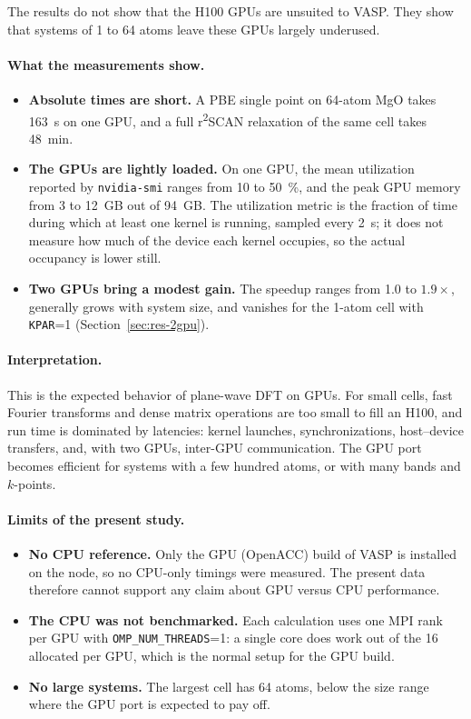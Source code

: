 \documentclass[11pt,letterpaper]{article}
\begin{document}
The results do not show that the H100 GPUs are unsuited to VASP. They show that systems of 1 to
64 atoms leave these GPUs largely underused.

\paragraph{What the measurements show.}
\begin{itemize}
  \item \textbf{Absolute times are short.} A PBE single point on 64-atom MgO takes \SI{163}{s}
        on one GPU, and a full r\textsuperscript{2}SCAN relaxation of the same cell takes
        \SI{48}{min}.
  \item \textbf{The GPUs are lightly loaded.} On one GPU, the mean utilization reported by
        \texttt{nvidia-smi} ranges from 10 to \SI{50}{\percent}, and the peak GPU memory from
        3 to \SI{12}{GB} out of \SI{94}{GB}. The utilization metric is the fraction of time
        during which at least one kernel is running, sampled every \SI{2}{s}; it does not
        measure how much of the device each kernel occupies, so the actual occupancy is lower
        still.
  \item \textbf{Two GPUs bring a modest gain.} The speedup ranges from 1.0 to $1.9\times$,
        generally grows with system size, and vanishes for the 1-atom cell with \texttt{KPAR}=1
        (Section~\ref{sec:res-2gpu}).
\end{itemize}

\paragraph{Interpretation.} This is the expected behavior of plane-wave DFT on GPUs. For small
cells, fast Fourier transforms and dense matrix operations are too small to fill an H100, and
run time is dominated by latencies: kernel launches, synchronizations, host--device transfers,
and, with two GPUs, inter-GPU communication. The GPU port becomes efficient for systems with a
few hundred atoms, or with many bands and $k$-points.

\paragraph{Limits of the present study.}
\begin{itemize}
  \item \textbf{No CPU reference.} Only the GPU (OpenACC) build of VASP is installed on the
        node, so no CPU-only timings were measured. The present data therefore cannot support
        any claim about GPU versus CPU performance.
  \item \textbf{The CPU was not benchmarked.} Each calculation uses one MPI rank per GPU with
        \texttt{OMP\_NUM\_THREADS}=1: a single core does work out of the 16 allocated per GPU,
        which is the normal setup for the GPU build.
  \item \textbf{No large systems.} The largest cell has 64 atoms, below the size range where
        the GPU port is expected to pay off.
\end{itemize}
\end{document}
